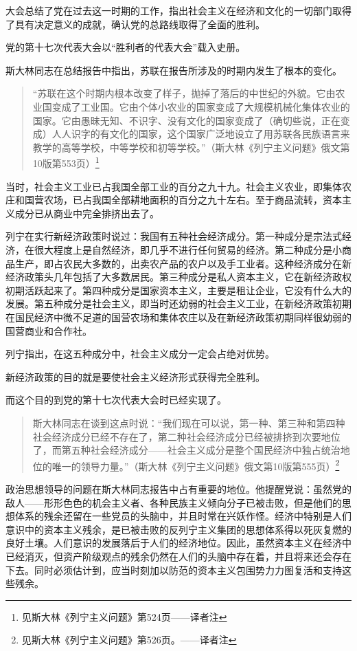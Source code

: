 大会总结了党在过去这一时期的工作，指出社会主义在经济和文化的一切部门取得了具有决定意义的成就，确认党的总路线取得了全面的胜利。

党的第十七次代表大会以“胜利者的代表大会”载入史册。

斯大林同志在总结报告中指出，苏联在报告所涉及的时期内发生了根本的变化。

\begin{quotation}
“苏联在这个时期内根本改变了样子，抛掉了落后的中世纪的外貌。它由农业国变成了工业国。它由个体小农业的国家变成了大规模机械化集体农业的国家。它由愚昧无知、不识字、没有文化的国家变成了（确切些说，正在变成）人人识字的有文化的国家，这个国家广泛地设立了用苏联各民族语言来教学的高等学校，中等学校和初等学校。”（斯大林《列宁主义问题》俄文第10版第553页）\footnote{见斯大林《列宁主义问题》第524页——译者注}
\end{quotation}

当时，社会主义工业已占我国全部工业的百分之九十九。社会主义农业，即集体农庄和国营农场，已占我国全部耕地面积的百分之九十左右。至于商品流转，资本主义成分已从商业中完全排挤出去了。

列宁在实行新经济政策时说过：我国有五种社会经济成分。第一种成分是宗法式经济，在很大程度上是自然经济，即几乎不进行任何贸易的经济。第二种成分是小商品生产，即占农民大多数的，出卖农产品的农户以及手工业者。这种经济成分在新经济政策头几年包括了大多数居民。第三种成分是私人资本主义，它在新经济政权初期活跃起来了。第四种成分是国家资本主义，主要是租让企业，它没有什么大的发展。第五种成分是社会主义，即当时还幼弱的社会主义工业，在新经济政策初期在国民经济中微不足道的国营农场和集体农庄以及在新经济政策初期同样很幼弱的国营商业和合作社。

列宁指出，在这五种成分中，社会主义成分一定会占绝对优势。

新经济政策的目的就是要使社会主义经济形式获得完全胜利。

而这个目的到党的第十七次代表大会时已经实现了。

\begin{quotation}
斯大林同志在谈到这点时说：“我们现在可以说，第一种、第三种和第四种社会经济成分已经不存在了，第二种社会经济成分已经被排挤到次要地位了，而第五种社会经济成分——社会主义成分是整个国民经济中独占统治地位的唯一的领导力量。”（斯大林《列宁主义问题》俄文第10版第555页）\footnote{见斯大林《列宁主义问题》第526页。——译者注}
\end{quotation}

政治思想领导的问题在斯大林同志报告中占有重要的地位。他提醒党说：虽然党的敌人——形形色色的机会主义者、各种民族主义倾向分子已被击败，但是他们的思想体系的残余还留在一些党员的头脑中，并且时常在兴妖作怪。经济中特别是人们意识中的资本主义残余，是已被击败的反列宁主义集团的思想体系得以死灰复燃的良好土壤。人们意识的发展落后于人们的经济地位。因此，虽然资本主义在经济中已经消灭，但资产阶级观点的残余仍然在人们的头脑中存在着，并且将来还会存在下去。同时必须估计到，应当时刻加以防范的资本主义包围势力力图复活和支持这些残余。

